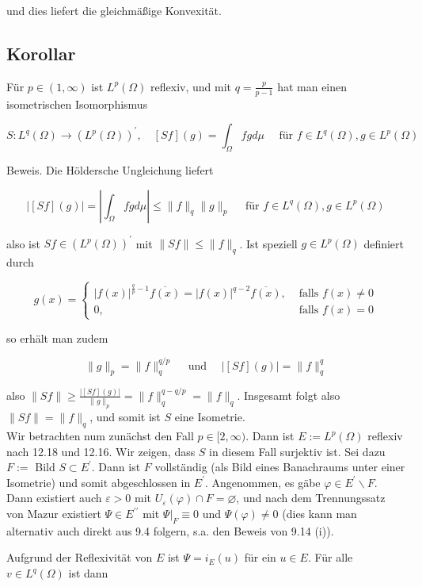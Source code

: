 \documentclass[10pt, letterpaper]{article}
\begin{document}
und dies liefert die gleichmäßige Konvexität.

\subsection*{Korollar}
Für $p \in(1, \infty)$ ist $L^{p}(\Omega)$ reflexiv, und mit $q=\frac{p}{p-1}$ hat man einen isometrischen Isomorphismus

$$
S: L^{q}(\Omega) \rightarrow\left(L^{p}(\Omega)\right)^{\prime}, \quad[S f](g)=\int_{\Omega} f g d \mu \quad \text { für } f \in L^{q}(\Omega), g \in L^{p}(\Omega)
$$

Beweis. Die Höldersche Ungleichung liefert

$$
|[S f](g)|=\left|\int_{\Omega} f g d \mu\right| \leq\|f\|_{q}\|g\|_{p} \quad \text { für } f \in L^{q}(\Omega), g \in L^{p}(\Omega)
$$

also ist $S f \in\left(L^{p}(\Omega)\right)^{\prime}$ mit $\|S f\| \leq\|f\|_{q}$. Ist speziell $g \in L^{p}(\Omega)$ definiert durch

$$
g(x)= \begin{cases}|f(x)|^{\frac{q}{p}-1} \overline{f(x)}=|f(x)|^{q-2} \overline{f(x)}, & \text { falls } f(x) \neq 0 \\ 0, & \text { falls } f(x)=0\end{cases}
$$

so erhält man zudem

$$
\|g\|_{p}=\|f\|_{q}^{q / p} \quad \text { und } \quad|[S f](g)|=\|f\|_{q}^{q}
$$

also $\|S f\| \geq \frac{|[S f](g)|}{\|g\|_{p}}=\|f\|_{q}^{q-q / p}=\|f\|_{q}$. Insgesamt folgt also $\|S f\|=\|f\|_{q}$, und somit ist $S$ eine Isometrie.\\
Wir betrachten num zunächst den Fall $p \in[2, \infty)$. Dann ist $E:=L^{p}(\Omega)$ reflexiv nach 12.18 und 12.16. Wir zeigen, dass $S$ in diesem Fall surjektiv ist. Sei dazu $F:=$ Bild $S \subset E^{\prime}$. Dann ist $F$ vollständig (als Bild eines Banachraums unter einer Isometrie) und somit abgeschlossen in $E^{\prime}$. Angenommen, es gäbe $\varphi \in E^{\prime} \backslash F$. Dann existiert auch $\varepsilon>0$ mit $U_{\varepsilon}(\varphi) \cap F=\varnothing$, und nach dem Trennungssatz von Mazur existiert $\Psi \in E^{\prime \prime}$ mit $\left.\Psi\right|_{F} \equiv 0$ und $\Psi(\varphi) \neq 0$ (dies kann man alternativ auch direkt aus 9.4 folgern, s.a. den Beweis von 9.14 (i)).

Aufgrund der Reflexivität von $E$ ist $\Psi=i_{E}(u)$ für ein $u \in E$. Für alle $v \in L^{q}(\Omega)$ ist dann
\end{document}
